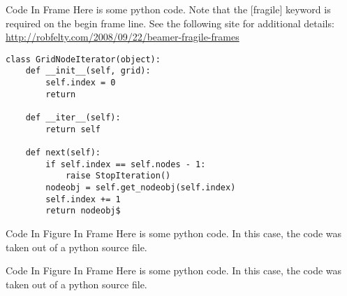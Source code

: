 \documentclass{beamer}
\begin{document}
\begin{frame}[fragile]{Code In Frame}
Here is some python code.  Note that the [fragile] keyword is required on the begin frame line.  See the following site for additional details: \url{http://robfelty.com/2008/09/22/beamer-fragile-frames}
\begin{lstlisting}
class GridNodeIterator(object):
    def __init__(self, grid):
        self.index = 0
        return
        
    def __iter__(self):
        return self
        
    def next(self):
        if self.index == self.nodes - 1:
            raise StopIteration()
        nodeobj = self.get_nodeobj(self.index)
        self.index += 1
        return nodeobj$
\end{lstlisting}
\end{frame}


\begin{frame}{Code In Figure In Frame}
Here is some python code.  In this case, the code was taken out of a python source file.
  \begin{figure}
  \centering
        \lstset{numbers=none}
        
   \end{figure}

\end{frame}

\begin{frame}{Code In Figure In Frame}
Here is some python code.  In this case, the code was taken out of a python source file.
  \begin{figure}
  \centering
        \lstset{numbers=none}
        
   \end{figure}

\end{frame}
\end{document}
